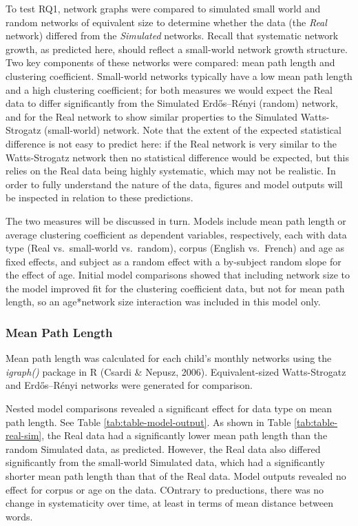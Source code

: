 \documentclass[
  man]{apa6}
\begin{document}
To test RQ1, network graphs were compared to simulated small world and random networks of equivalent size to determine whether the data (the \emph{Real} network) differed from the \emph{Simulated} networks. Recall that systematic network growth, as predicted here, should reflect a small-world network growth structure. Two key components of these networks were compared: mean path length and clustering coefficient. Small-world networks typically have a low mean path length and a high clustering coefficient; for both measures we would expect the Real data to differ significantly from the Simulated Erdős--Rényi (random) network, and for the Real network to show similar properties to the Simulated Watts-Strogatz (small-world) network. Note that the extent of the expected statistical difference is not easy to predict here: if the Real network is very similar to the Watts-Strogatz network then no statistical difference would be expected, but this relies on the Real data being highly systematic, which may not be realistic. In order to fully understand the nature of the data, figures and model outputs will be inspected in relation to these predictions.

The two measures will be discussed in turn. Models include mean path length or average clustering coefficient as dependent variables, respectively, each with data type (Real vs.~small-world vs.~random), corpus (English vs.~French) and age as fixed effects, and subject as a random effect with a by-subject random slope for the effect of age. Initial model comparisons showed that including network size to the model improved fit for the clustering coefficient data, but not for mean path length, so an age*network size interaction was included in this model only.

\hypertarget{mean-path-length}{%
\subsubsection{Mean Path Length}\label{mean-path-length}}

Mean path length was calculated for each child's monthly networks using the \emph{igraph()} package in R (Csardi \& Nepusz, 2006). Equivalent-sized Watts-Strogatz and Erdős--Rényi networks were generated for comparison.

Nested model comparisons revealed a significant effect for data type on mean path length. See Table \ref{tab:table-model-output}. As shown in Table \ref{tab:table-real-sim}, the Real data had a significantly lower mean path length than the random Simulated data, as predicted. However, the Real data also differed significantly from the small-world Simulated data, which had a significantly shorter mean path length than that of the Real data. Model outputs revealed no effect for corpus or age on the data. COntrary to preductions, there was no change in systematicity over time, at least in terms of mean distance between words.
\end{document}
